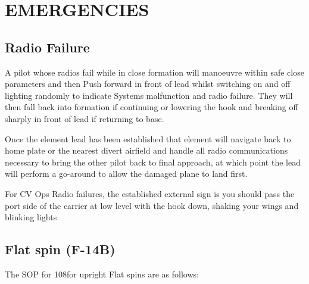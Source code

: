 \section{EMERGENCIES}

\subsection{Radio Failure}

A pilot whose radios fail while in close formation will manoeuvre within safe
close parameters and then Push forward in front of lead whilst switching on and
off lighting randomly to indicate Systems malfunction and radio failure. They
will then fall back into formation if continuing or lowering the hook and
breaking off sharply in front of lead if returning to base.

Once the element lead has been established that element will navigate back to
home plate or the nearest divert airfield and handle all radio communications
necessary to bring the other pilot back to final approach, at which point the
lead will perform a go-around to allow the damaged plane to land first.

For CV Ops Radio failures, the established external sign is you should pass the
port side of the carrier at low level with the hook down, shaking your wings
and blinking lights

\subsection{Flat spin (F-14B)}

The SOP for 108\th for upright Flat spins are as follows:

